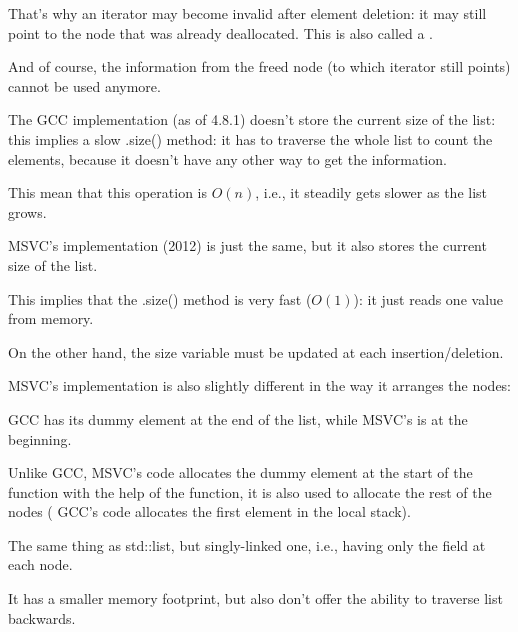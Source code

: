 That's why an iterator may become invalid after element deletion: 
it may still point to the node that was already deallocated.
This is also called a .

And of course, the information from the freed node (to which iterator still points) 
cannot be used anymore.

The GCC implementation (as of 4.8.1) doesn't store the current size of the list: this implies a slow .size() method:
it has to traverse the whole list to count the elements, because it doesn't have any other way to get the information.

This mean that this operation is $O(n)$, i.e., it steadily gets slower as the list grows.





\label{MSVC_std_list}

MSVC's implementation (2012) is just the same, but it also stores the current size of the list.

This implies that the .size() method is very fast ($O(1)$): it just reads one value from memory.

On the other hand, the size variable must be updated at each insertion/deletion.

MSVC's implementation is also slightly different in the way it arranges the nodes:



GCC has its dummy element at the end of the list, while MSVC's is at the beginning.



Unlike GCC, MSVC's code allocates the dummy element at the start of the function with the help of the  function,
it is also used to allocate the rest of the nodes (
GCC's code allocates the first element in the local stack).




The same thing as std::list, but singly-linked one, i.e., having only the  field at each node.

It has a smaller memory footprint, but also don't offer the ability to traverse list backwards.

